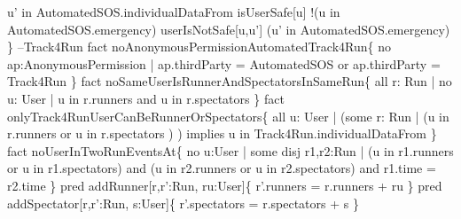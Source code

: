 \documentclass[a4paper]{article}
\begin{document}
{\newline 	u' in AutomatedSOS.individualDataFrom
\newline 	isUserSafe[u]
\newline 	!(u in AutomatedSOS.emergency)
\newline 
\newline 	userIsNotSafe[u,u']
\newline 	(u' in AutomatedSOS.emergency)
\newline \}
\newline 
\newline --Track4Run
\newline 
\newline fact noAnonymousPermissionAutomatedTrack4Run\{
\newline 	no ap:AnonymousPermission | ap.thirdParty = AutomatedSOS or ap.thirdParty = Track4Run 
\newline \}
\newline 
\newline fact noSameUserIsRunnerAndSpectatorsInSameRun\{
\newline all r: Run | no u: User | u in r.runners and u in r.spectators
\newline \}
\newline 
\newline fact onlyTrack4RunUserCanBeRunnerOrSpectators\{
\newline all u: User | (some r: Run | (u in r.runners or u in 
\newline r.spectators ) ) implies u in
Track4Run.individualDataFrom
\newline \}
\newline 
\newline fact noUserInTwoRunEventsAt\{
\newline 	no u:User | some disj r1,r2:Run | (u in r1.runners or u in r1.spectators) and (u in r2.runners or u in r2.spectators) and r1.time = r2.time
\newline \}
\newline 
\newline pred addRunner[r,r':Run, ru:User]\{
\newline 	r'.runners = r.runners + ru
\newline \}
\newline 
\newline pred addSpectator[r,r':Run, s:User]\{
\newline 	r'.spectators = r.spectators + s
\newline \}
\newline 
}
\end{document}
